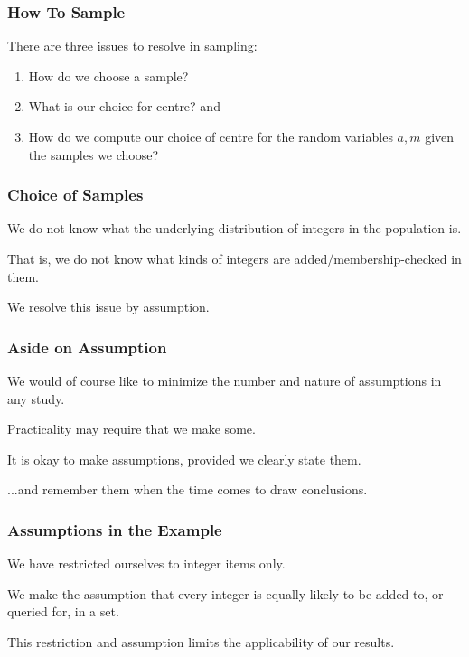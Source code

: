 \begin{frame}
\frametitle{How To Sample}
\begin{changemargin}{1cm}

There are three issues to resolve in sampling:

\begin{enumerate}
	\item How do we choose a sample? 
	\item What is our choice for centre? and 
	\item How do we compute our choice of centre for the random variables $a,m$ given the
samples we choose?
\end{enumerate}

\end{changemargin}
\end{frame}

\begin{frame}
\frametitle{Choice of Samples}
\begin{changemargin}{1cm}

We do not know what the underlying distribution of integers in the population is.

That is, we do not know what kinds of integers are added/membership-checked
in them. 

We resolve this issue by assumption.

\end{changemargin}
\end{frame}

\begin{frame}
\frametitle{Aside on Assumption}
\begin{changemargin}{1cm}

We would of course like to minimize the number and nature of
assumptions in any study. 

Practicality may require that
we make some. 

It is okay to make assumptions, provided
we clearly state them. 

...and remember them when the time comes to draw conclusions.

\end{changemargin}
\end{frame}

\begin{frame}
\frametitle{Assumptions in the Example}
\begin{changemargin}{1cm}

We have restricted ourselves to integer items only.

We make the assumption that every integer is
equally likely to be added to, or queried for, in a set.

This restriction and assumption limits the applicability
of our results. 

\end{changemargin}
\end{frame}

